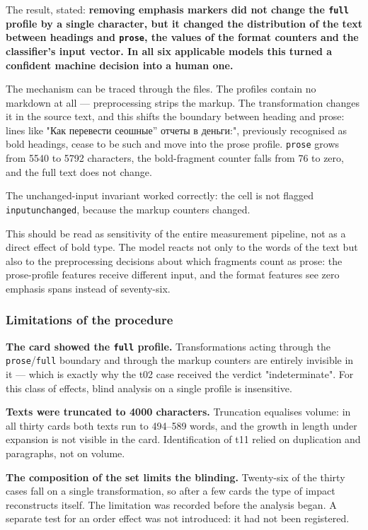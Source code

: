 \documentclass[11pt,a4paper]{article}
\renewcommand{\_}{\textunderscore\allowbreak}
\begin{document}
The result, stated: \textbf{removing emphasis markers did not change the \texttt{full} profile
by a single character, but it changed the distribution of the text between headings
and \texttt{prose}, the values of the format counters and the classifier's input vector. In
all six applicable models this turned a confident machine decision into a human
one.}

The mechanism can be traced through the files. The profiles contain no markdown
at all — preprocessing strips the markup. The transformation changes it in the source
text, and this shifts the boundary between heading and prose: lines like "\foreignlanguage{russian}{Как перевести}
\quotedblbase{}\foreignlanguage{russian}{сеошные}'' \foreignlanguage{russian}{отчеты в деньги}:", previously recognised as bold headings, cease to be such
and move into the prose profile. \texttt{prose} grows from 5540 to
5792 characters, the bold-fragment counter falls from 76 to zero, and the full text
does not change.

The unchanged-input invariant worked correctly: the cell is not flagged
\texttt{input\_unchanged}, because the markup counters changed.

This should be read as sensitivity of the entire measurement pipeline, not as a
direct effect of bold type. The model reacts not only to the words of the text but
also to the preprocessing decisions about which fragments count as prose: the
prose-profile features receive different input, and the format features see zero
emphasis spans instead of seventy-six.

\subsubsection{Limitations of the procedure}

\textbf{The card showed the \texttt{full} profile.} Transformations acting through the
\texttt{prose}/\texttt{full} boundary and through the markup counters are entirely invisible
in it — which is exactly why the t02 case received the verdict "indeterminate". For
this class of effects, blind analysis on a single profile is insensitive.

\textbf{Texts were truncated to 4000 characters.} Truncation equalises volume: in all
thirty cards both texts run to 494–589 words, and the growth in length under expansion
is not visible in the card. Identification of t11 relied on duplication and paragraphs,
not on volume.

\textbf{The composition of the set limits the blinding.} Twenty-six of the thirty cases
fall on a single transformation, so after a few cards the type of impact reconstructs
itself. The limitation was recorded before the analysis began.
A separate test for an order effect was not introduced: it had not been registered.
\end{document}
